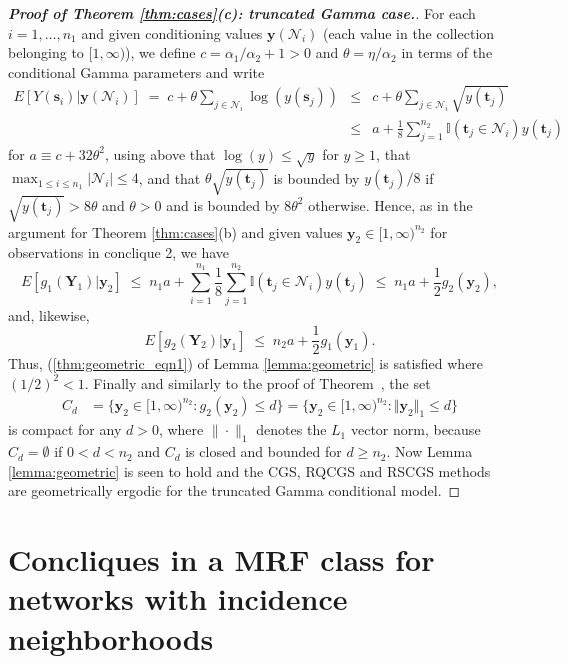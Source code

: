 \documentclass[12pt]{article}
\theoremstyle{definition}
\begin{document}
\begin{proof}[\bf Proof of Theorem \ref{thm:cases}(c): truncated Gamma case.]
For each $i=1,\ldots, n_1$ and given conditioning values $\boldsymbol y(\mathcal{N}_i)$ (each value in the collection belonging to $[1,\infty)$), we define $c = \alpha_1/\alpha_2 +1>0$ and $\theta  = \eta/\alpha_2$ in terms of the conditional Gamma parameters and write
  \begin{eqnarray*}
  E[ Y(\boldsymbol s_i) | \boldsymbol y(\mathcal{N}_i)]  \;=\;c  + \theta  \sum_{j \in \mathcal{N}_i} \log(y(\boldsymbol s_j))    
     &\leq&  c +\theta  \sum_{j \in \mathcal{N}_i}  \sqrt{y(\boldsymbol t_j)}   \\
     & \leq &a +  \frac{1}{8}\sum_{j=1}^{n_2} \mathbb{I}(\boldsymbol t_j \in\mathcal{N}_i) y(\boldsymbol t_j)
  \end{eqnarray*}
 for $a \equiv c  + 32\theta^2$, using above that  $\log(y) \le \sqrt{y}$ for $y \ge 1$, that $ \max_{1 \leq i \leq n_1}| \mathcal{N}_i| \leq 4 $, and that
  $\theta \sqrt{y(\boldsymbol t_j)}$ is bounded by $y(\boldsymbol t_j)/8$ if $\sqrt{y(\boldsymbol t_j)}>8\theta$ and $\theta>0$
  and is bounded by $8 \theta^2$ otherwise. Hence, as in the argument for  Theorem \ref{thm:cases}(b) and given values    $\boldsymbol y_2 \in [1,\infty)^{n_2}$ for observations in conclique 2, we have 
\[E  [g_1(\boldsymbol Y_1) \big| \boldsymbol y_2 ]  \;\leq\;  n_1 a   + \sum_{i=1}^{n_1}\frac{1}{8}\sum_{j=1}^{n_2}  \mathbb{I}(\boldsymbol t_j \in\mathcal{N}_i) y(\boldsymbol t_j)
\;\leq\;  n_1 a  +  \frac{1}{2} g_2(\boldsymbol y_2 ),
\]
and, likewise, 
\[E  [g_2(\boldsymbol Y_2) \big| \boldsymbol y_1 ]  \;\leq\;  n_2 a  +  \frac{1}{2} g_1(\boldsymbol y_1 ).
\]
  Thus, (\ref{thm:geometric_eqn1}) of Lemma \ref{lemma:geometric} is satisfied where $ (1/2)^2 < 1$. Finally and similarly to the proof of Theorem~,  the set 
\begin{align*}
C_d &= \{\boldsymbol y_2 \in [1,\infty)^{n_2} : g_{2}(\boldsymbol y_2) \le d\} =   \{ \boldsymbol y_2 \in [1,\infty)^{n_2} :  \Vert\boldsymbol y_2 \Vert_1  \le d \} 
\end{align*}
is compact for any $d > 0$, where $\|\cdot\|_1$ denotes  the $L_1$ vector norm, because  $C_d = \emptyset$ if $0 < d< n_2$ and $C_d$ is closed and bounded for $d \ge n_2$.
 Now  Lemma \ref{lemma:geometric} is seen to hold and   the CGS, RQCGS  and RSCGS methods are geometrically ergodic for the truncated Gamma conditional model. 
\end{proof}

\section{Concliques in a MRF class for networks with incidence neighborhoods} \label{concliques-existence}
\end{document}
